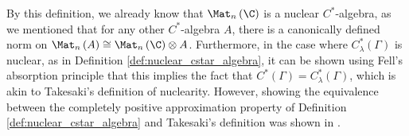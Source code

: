 By this definition, we already know that $\Mat_n\left( \C \right)$ is a nuclear $C^{\ast}$-algebra, as we mentioned that for any other $C^{\ast}$-algebra $A$, there is a canonically defined norm on $\Mat_n\left( A \right)\cong \Mat_n\left( \C \right)\otimes A$. Furthermore, in the case where $C^{\ast}_{\lambda}\left( \Gamma \right)$ is nuclear, as in Definition \ref{def:nuclear_cstar_algebra}, it can be shown using Fell's absorption principle that this implies the fact that $C^{\ast}\left( \Gamma \right) = C^{\ast}_{\lambda}\left( \Gamma \right)$, which is akin to Takesaki's definition of nuclearity. However, showing the equivalence between the completely positive approximation property of Definition \ref{def:nuclear_cstar_algebra} and Takesaki's definition was shown in \cite{choi_nuclearity}.
